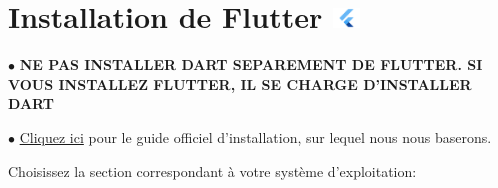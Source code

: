 \section[Installation de Flutter]{Installation de Flutter \includegraphics[height=15pt]{figures-logos/flutter.pdf}}

\par $\bullet$ \textbf{NE PAS INSTALLER DART SEPAREMENT DE FLUTTER. SI VOUS INSTALLEZ FLUTTER, IL SE CHARGE D'INSTALLER DART}
\par $\bullet$  \href{https://docs.flutter.dev/get-started/install}{Cliquez ici} pour le guide officiel d'installation, sur lequel nous nous baserons.

Choisissez la section correspondant à votre système d'exploitation:


